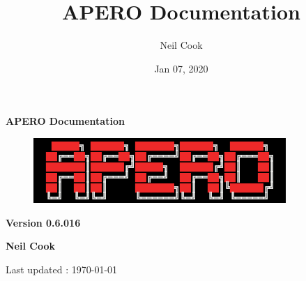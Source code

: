\documentclass[a4paper,10pt,english]{report}
\title{APERO Documentation}
\date{Jan 07, 2020}
\author{Neil Cook}
\begin{document}
\pagestyle{empty}


        \begin{titlepage}
            \centering

            \vspace*{40mm} %
            \textbf{\Huge {APERO Documentation}}

            \vspace{5mm}
            \begin{figure}[!h]
                \centering
                \includegraphics[scale=1]{apero_logo.png}
            \end{figure}
            
            \vspace{5mm}
            \Large \textbf{Version 0.6.016}
            
            \vspace{5mm}
            \Large \textbf{{Neil Cook}}

            \vspace*{0mm}
            \small  Last updated : \MonthYearFormat\today


        \end{titlepage}

        \clearpage
        \tableofcontents

        
\pagestyle{plain}
 
\pagestyle{normal}
\label{\detokenize{index::doc}}
\end{document}
